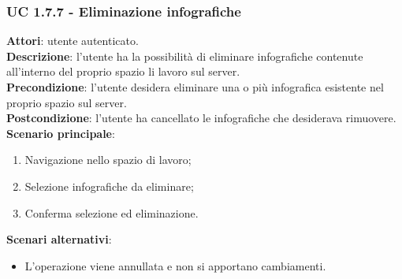 	\subsubsection{UC 1.7.7 - Eliminazione infografiche}{
		\label{uc1.7.7}
		\textbf{Attori}: utente autenticato.	\\
		\textbf{Descrizione}: l'utente ha la possibilità di eliminare infografiche contenute all'interno del proprio spazio li lavoro sul server. \\
		\textbf{Precondizione}: l'utente desidera eliminare una o più infografica esistente nel proprio spazio sul server.	\\
		\textbf{Postcondizione}: l'utente ha cancellato le infografiche che desiderava rimuovere.	\\
		\textbf{Scenario principale}:
		\begin{enumerate}
			\item Navigazione nello spazio di lavoro;
			\item Selezione infografiche da eliminare;
			\item Conferma selezione ed eliminazione.
		\end{enumerate}
		\textbf{Scenari alternativi}: 
		\begin{itemize}
			\item L'operazione viene annullata e non si apportano cambiamenti.
		\end{itemize}
		}
